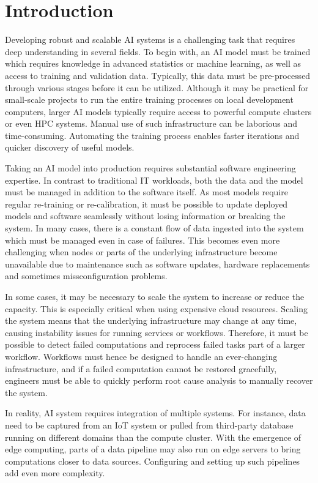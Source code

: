 \documentclass{article}
\begin{document}
\section{Introduction}
Developing robust and scalable AI systems is a challenging task that requires deep understanding in several fields. To begin with, an AI model must be trained which requires knowledge in advanced statistics or machine learning, as well as access to training and validation data. Typically, this data must be pre-processed through various stages before it can be utilized. Although it may be practical for small-scale projects to run the entire training processes on local development computers, larger AI models typically require access to powerful compute clusters or even HPC systems. Manual use of such infrastructure can be laborious and time-consuming. Automating the training process enables faster iterations and quicker discovery of useful models.

Taking an AI model into production requires substantial software engineering expertise. In contrast to traditional IT workloads, both the data and the model must be managed in addition to the software itself. As most models require regular re-training or re-calibration, it must be possible to update deployed models and software seamlessly without losing information or breaking the system. In many cases, there is a constant flow of data ingested into the system which must be managed even in case of failures. This becomes even more challenging when nodes or parts of the underlying infrastructure become unavailable due to maintenance such as software updates, hardware replacements and sometimes missconfiguration problems.

In some cases, it may be necessary to scale the system to increase or reduce the capacity. This is especially critical when using expensive cloud resources. Scaling the system means that the underlying infrastructure may change at any time, causing instability issues for running services or workflows. Therefore, it must be possible to detect failed computations and reprocess failed tasks part of a larger workflow. Workflows must hence be designed to handle an ever-changing infrastructure, and if a failed computation cannot be restored gracefully, engineers must be able to quickly perform root cause analysis to manually recover the system.

In reality, AI system requires integration of multiple systems. For instance, data need to be captured from an IoT system or pulled from third-party database running on different domains than the compute cluster. With the emergence of edge computing, parts of a data pipeline may also run on edge servers to bring computations closer to data sources. Configuring and setting up such pipelines add even more complexity.
\end{document}
